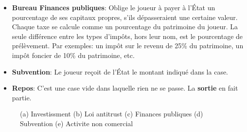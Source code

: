 \documentclass[12pt]{article}
\begin{document}
\begin{itemize}
        \item  \textbf{Bureau Finances publiques}: Oblige le joueur à payer à l'État un pourcentage de ses
    capitaux propres, s'ils dépasseraient une certaine valeur. Chaque taxe se calcule comme un pourcentage du patrimoine du joueur.
    La seule différence entre les types d'impôts, hors leur nom, est le pourcentage de prélèvement. 
    Par exemples: un impôt sur le revenu de 25\% du patrimoine, un impôt foncier de 10\% du patrimoine, etc.
        \item \textbf{Subvention}: Le joueur reçoit de l'État le montant indiqué dans la case.
        \item \textbf{Repos}: C'est une case vide dans laquelle rien ne se passe. La \textbf{sortie} en fait partie.
    \end{itemize}
    
    
	  \begin{figure}
    \centering

   
    \caption{(a) Investissment (b) Loi antitrust (c) Finances publiques (d) Subvention (e) Activite non comercial}
    \label{fig:cases}
\end{figure}
\end{document}
